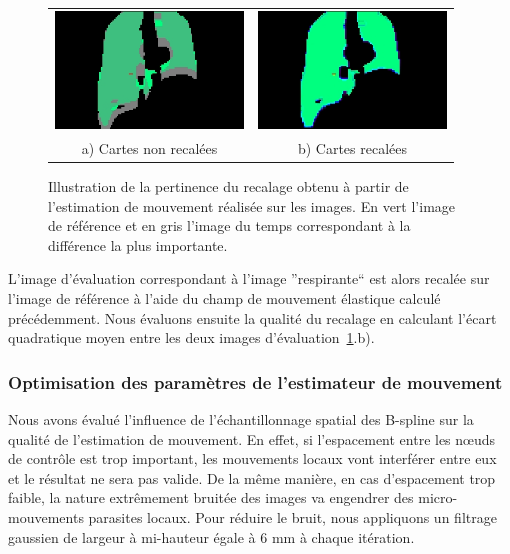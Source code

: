 \begin{figure}
\centering
\begin{tabular}{c c}
	\includegraphics[width=5cm]{images/sansCorrection} & \includegraphics[width=5cm]{images/avecCorrection} \\
	a) Cartes non recalées				& b) Cartes recalées
\end{tabular}
\caption[Illustration du recalage obtenu]{Illustration de la pertinence du recalage obtenu à partir de l'estimation de mouvement réalisée sur les images. En vert l'image de référence et en gris l'image du temps correspondant à la différence la plus importante. }
\label{lab:illustrationRecalage}
\end{figure}

L'image d'évaluation correspondant à l'image ''respirante`` est alors recalée sur l'image de référence à l'aide du champ de mouvement élastique calculé précédemment. Nous évaluons ensuite la qualité du recalage en calculant l'écart quadratique moyen entre les deux images d'évaluation~\ref{lab:illustrationRecalage}.b).

\subsubsection{Optimisation des paramètres de l'estimateur de mouvement}

Nous avons évalué l'influence de l'échantillonnage spatial des B-spline sur la qualité de l'estimation de mouvement. En effet, si l'espacement entre les nœuds de contrôle est trop important, les mouvements locaux vont interférer entre eux et le résultat ne sera pas valide. De la même manière, en cas d'espacement trop faible, la nature extrêmement bruitée des images va engendrer des micro-mouvements parasites locaux. Pour réduire le bruit, nous appliquons un filtrage gaussien de largeur à mi-hauteur égale à 6 mm à chaque itération.

